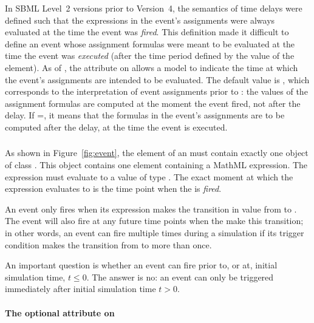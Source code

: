 In SBML Level~2 versions prior to Version~4, the semantics of
\Event time delays were defined such that the expressions in the
event's assignments were always evaluated at the time the event
was \emph{fired}.  This definition made it difficult to define an
event whose assignment formulas were meant to be evaluated at the
time the event was \emph{executed} (\ie after the time period
defined by the value of the \Delay element).  As of \sbmltwofour,
the  attribute on \Event allows a
model to indicate the time at which the event's assignments are
intended to be evaluated.  The default value is , which
corresponds to the interpretation of event assignments prior to
\sbmltwofour: the values of the assignment formulas are computed
at the moment the event fired, not after the delay.  If
=, it means that the
formulas in the event's assignments are to be computed after the
delay, at the time the event is executed.




\subsubsection{}
\label{sec:trigger}
\label{sec:event-trigger}

As shown in Figure~\ref{fig:event}, the  element of
an \Event must contain exactly one object of class \Trigger.  This
object contains one  element containing a MathML
expression.  The expression must evaluate to a value of type
.  The exact moment at which the expression
evaluates to  is the time point when the \Event is
\emph{fired}.

An event only fires when its \Trigger expression makes the
transition in value from  to .  The event
will also fire at any future time points when the 
make this transition; in other words, an event can fire multiple
times during a simulation if its trigger condition makes the
transition from  to  more than once.

An important question is whether an event can fire prior to, or
at, initial simulation time, \ie $t \leq 0$.  The answer is no: an
event can only be triggered immediately after initial simulation
time \ie $t > 0$.


\paragraph{The optional  attribute on }
\label{sec:trigger-sboterm}

